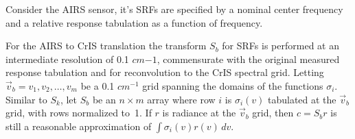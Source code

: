 \documentclass[twocolumn,10pt]{article}
\newcommand {\srf}  {\mbox{\small SRF}}
\begin{document}




Consider the AIRS sensor, it's SRFs are specified by a nominal center frequency and a relative response tabulation as a function of frequency.

For the AIRS to CrIS translation the transform $S_b$ for {\srf}s is performed at an intermediate
resolution of 0.1 $cm{-1}$, commensurate with the original measured response tabulation and for reconvolution to the CrIS spectral grid.  Letting $\vec v_b = v_1,v_2,\ldots,v_m$ be a
0.1 $cm^{-1}$ grid spanning the domains of the functions $\sigma_i$.
Similar to $S_k$, let $S_b$ be an $n\times m$ array where row $i$ is
$\sigma_i(v)$ tabulated at the $\vec v_b$ grid, with rows normalized
to~1.  If $r$ is radiance at the $\vec v_b$ grid, then $c = S_b r$
is still a reasonable approximation of $\int\sigma_i(v)r(v)\,dv$.
\end{document}
